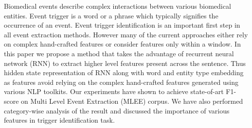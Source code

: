 Biomedical events describe complex interactions between various biomedical entities. Event trigger is a word or a phrase which typically signifies the occurrence of an event. Event trigger identification is an important first step in all event extraction methods. However many of the current approaches either rely on complex hand-crafted features or consider features only within a window. In this paper we propose a method that takes the advantage of recurrent neural network (RNN) to extract higher level features present across the sentence. Thus hidden state representation of RNN along with word and entity type embedding as features avoid relying on the complex hand-crafted features generated using various NLP toolkits. Our experiments have shown to achieve state-of-art F1-score on Multi Level Event Extraction (MLEE) corpus. We have also performed category-wise analysis of the result and discussed the importance of various features in trigger identification task.
